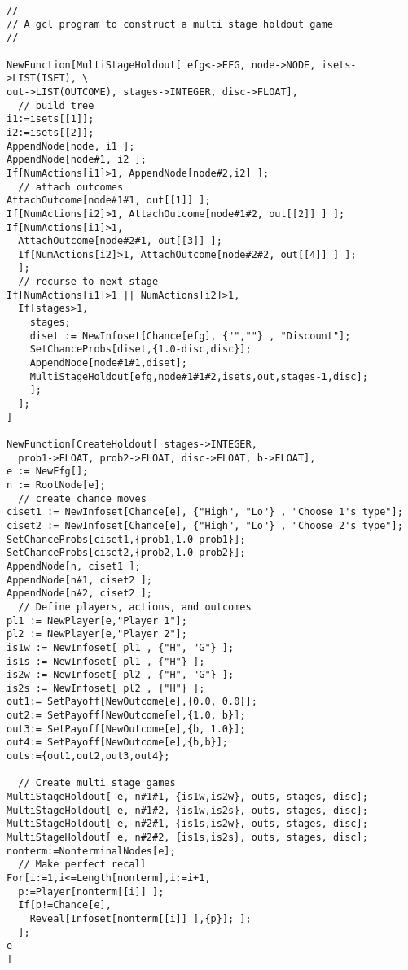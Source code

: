 \begin{verbatim}
//
// A gcl program to construct a multi stage holdout game
//

NewFunction[MultiStageHoldout[ efg<->EFG, node->NODE, isets->LIST(ISET), \
out->LIST(OUTCOME), stages->INTEGER, disc->FLOAT],
  // build tree
i1:=isets[[1]];
i2:=isets[[2]];
AppendNode[node, i1 ];
AppendNode[node#1, i2 ];
If[NumActions[i1]>1, AppendNode[node#2,i2] ];
  // attach outcomes
AttachOutcome[node#1#1, out[[1]] ]; 
If[NumActions[i2]>1, AttachOutcome[node#1#2, out[[2]] ] ];
If[NumActions[i1]>1, 
  AttachOutcome[node#2#1, out[[3]] ];
  If[NumActions[i2]>1, AttachOutcome[node#2#2, out[[4]] ] ];
  ];
  // recurse to next stage
If[NumActions[i1]>1 || NumActions[i2]>1,
  If[stages>1,
    stages;
    diset := NewInfoset[Chance[efg], {"",""} , "Discount"];
    SetChanceProbs[diset,{1.0-disc,disc}];
    AppendNode[node#1#1,diset];
    MultiStageHoldout[efg,node#1#1#2,isets,out,stages-1,disc];
    ];
  ];
]

NewFunction[CreateHoldout[ stages->INTEGER,
  prob1->FLOAT, prob2->FLOAT, disc->FLOAT, b->FLOAT],
e := NewEfg[];
n := RootNode[e];
  // create chance moves
ciset1 := NewInfoset[Chance[e], {"High", "Lo"} , "Choose 1's type"];
ciset2 := NewInfoset[Chance[e], {"High", "Lo"} , "Choose 2's type"];
SetChanceProbs[ciset1,{prob1,1.0-prob1}];
SetChanceProbs[ciset2,{prob2,1.0-prob2}];
AppendNode[n, ciset1 ];
AppendNode[n#1, ciset2 ];
AppendNode[n#2, ciset2 ];
  // Define players, actions, and outcomes
pl1 := NewPlayer[e,"Player 1"];
pl2 := NewPlayer[e,"Player 2"];
is1w := NewInfoset[ pl1 , {"H", "G"} ];
is1s := NewInfoset[ pl1 , {"H"} ];
is2w := NewInfoset[ pl2 , {"H", "G"} ];
is2s := NewInfoset[ pl2 , {"H"} ];
out1:= SetPayoff[NewOutcome[e],{0.0, 0.0}];
out2:= SetPayoff[NewOutcome[e],{1.0, b}];
out3:= SetPayoff[NewOutcome[e],{b, 1.0}];
out4:= SetPayoff[NewOutcome[e],{b,b}];
outs:={out1,out2,out3,out4};

  // Create multi stage games
MultiStageHoldout[ e, n#1#1, {is1w,is2w}, outs, stages, disc];
MultiStageHoldout[ e, n#1#2, {is1w,is2s}, outs, stages, disc];
MultiStageHoldout[ e, n#2#1, {is1s,is2w}, outs, stages, disc];
MultiStageHoldout[ e, n#2#2, {is1s,is2s}, outs, stages, disc];
nonterm:=NonterminalNodes[e];
  // Make perfect recall 
For[i:=1,i<=Length[nonterm],i:=i+1,
  p:=Player[nonterm[[i]] ];
  If[p!=Chance[e],
    Reveal[Infoset[nonterm[[i]] ],{p}]; ];
  ];	
e
]
\end{verbatim}


